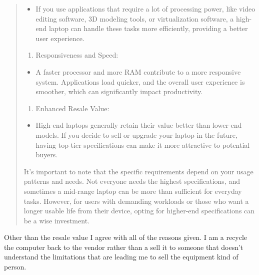 \documentclass[14pt, letterpaper,twoside]{extreport}
\begin{document}
\begin{quote}
\begin{itemize}

\item
 If you use applications that require a lot of processing power, like video editing software, 3D modeling tools, or virtualization software, a high-end laptop can handle these tasks more efficiently, providing a better user experience.
\end{itemize}

\begin{enumerate}
\def\labelenumi{\arabic{enumi}.}
\setcounter{enumi}{6}

\item
 Responsiveness and Speed:
\end{enumerate}

\begin{itemize}

\item
 A faster processor and more RAM contribute to a more responsive system. Applications load quicker, and the overall user experience is smoother, which can significantly impact productivity.
\end{itemize}

\begin{enumerate}
\def\labelenumi{\arabic{enumi}.}
\setcounter{enumi}{7}

\item
 Enhanced Resale Value:
\end{enumerate}

\begin{itemize}

\item
 High-end laptops generally retain their value better than lower-end models. If you decide to sell or upgrade your laptop in the future, having top-tier specifications can make it more attractive to potential buyers.
\end{itemize}

It's important to note that the specific requirements depend on your usage patterns and needs. Not everyone needs the highest specifications, and sometimes a mid-range laptop can be more than sufficient for everyday tasks. However, for users with demanding workloads or those who want a longer usable life from their device, opting for higher-end specifications can be a wise investment.
\end{quote}

Other than the resale value I agree with all of the reasons given. I am a recycle the computer back to the vendor rather than a sell it to someone that doesn't understand the limitations that are leading me to sell the equipment kind of person.
\end{document}
